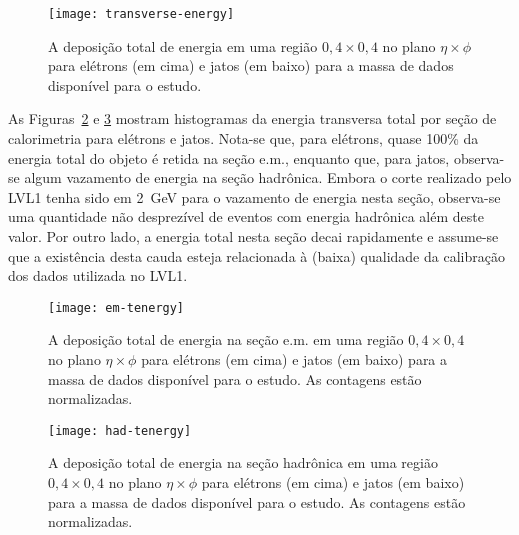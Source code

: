 
\begin{figure}
\begin{center}
\texttt{[image: transverse-energy]}
\end{center}
\caption{A deposição total de energia em uma região $0,4 \times 0,4$ no plano
$\eta\times\phi$ para elétrons (em cima) e jatos (em baixo) para a massa de
dados disponível para o estudo.}
\label{fig:transverse-energy}
\end{figure}

As Figuras~\ref{fig:em-tenergy} e \ref{fig:had-tenergy} mostram histogramas da
energia transversa total por seção de calorimetria para e\-lé\-trons e
jatos. Nota-se que, para elétrons, quase 100\% da energia total do objeto é
retida na seção e.m., enquanto que, para jatos, observa-se algum vazamento de
energia na seção hadrônica. Embora o corte realizado pelo LVL1 tenha sido em
2~GeV para o vazamento de energia nesta seção, observa-se uma quantidade não
desprezível de eventos com energia hadrônica além deste valor. Por outro lado,
a energia total nesta seção decai rapidamente e assume-se que a existência
desta cauda esteja relacionada à (baixa) qualidade da calibração dos dados
utilizada no LVL1.

\begin{figure}
\begin{center}
\texttt{[image: em-tenergy]}
\end{center}
\caption{A deposição total de energia na seção e.m. em uma região $0,4 \times
0,4$ no plano $\eta\times\phi$ para elétrons (em cima) e jatos (em baixo) para
a massa de dados disponível para o estudo. As contagens estão normalizadas.}
\label{fig:em-tenergy}
\end{figure}

\begin{figure}
\begin{center}
\texttt{[image: had-tenergy]}
\end{center}
\caption{A deposição total de energia na seção hadrônica em uma região $0,4 \times
0,4$ no plano $\eta\times\phi$ para elétrons (em cima) e jatos (em baixo) para
a massa de dados disponível para o estudo. As contagens estão normalizadas.}
\label{fig:had-tenergy}
\end{figure}


